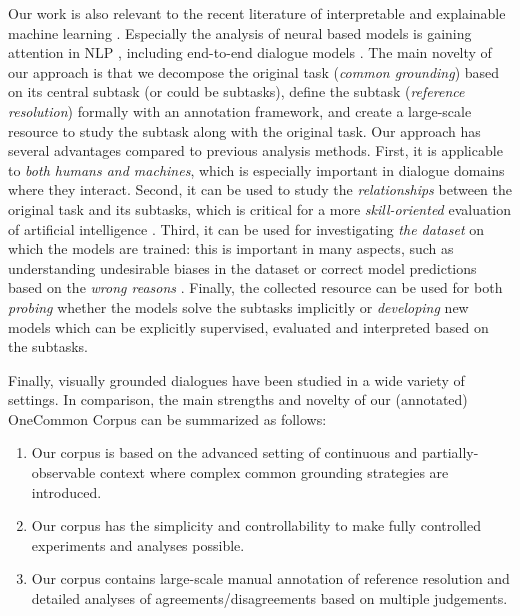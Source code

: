 Our work is also relevant to the recent literature of interpretable and explainable machine learning \citep{doshi2017towards,lipton2016mythos}. Especially the analysis of neural based models is gaining attention in NLP \citep{belinkov-glass-2019-analysis}, including end-to-end dialogue models \citep{sankar-etal-2019-neural}. The main novelty of our approach is that we decompose the original task (\textit{common grounding}) based on its central subtask (or could be subtasks), define the subtask (\textit{reference resolution}) formally with an annotation framework, and create a large-scale resource to study the subtask along with the original task. Our approach has several advantages compared to previous analysis methods. First, it is applicable to \textit{both humans and machines}, which is especially important in dialogue domains where they interact. Second, it can be used to study the \textit{relationships} between the original task and its subtasks, which is critical for a more \textit{skill-oriented} evaluation of artificial intelligence \citep{Hernndez-Orallo:2017:MME:3110808,sugawara2017prerequisite}. Third, it can be used for investigating \textit{the dataset} on which the models are trained: this is important in many aspects, such as understanding undesirable biases in the dataset \citep{gururangan-etal-2018-annotation,sugawara-etal-2018-makes} or correct model predictions based on the \textit{wrong reasons} \citep{mccoy-etal-2019-right}. Finally, the collected resource can be used for both \textit{probing} whether the models solve the subtasks implicitly \citep{linzen2016assessing} or \textit{developing} new models which can be explicitly supervised, evaluated and interpreted based on the subtasks.

Finally, visually grounded dialogues have been studied in a wide variety of settings. In comparison, the main strengths and novelty of our (annotated) OneCommon Corpus can be summarized as follows:

\begin{enumerate}[label=(\Alph*)]
  \item Our corpus is based on the advanced setting of continuous and partially-observable context where complex common grounding strategies are introduced.
  \item Our corpus has the simplicity and controllability to make fully controlled experiments and analyses possible.
  \item Our corpus contains large-scale manual annotation of reference resolution and detailed analyses of agreements/disagreements based on multiple judgements.
\end{enumerate}

